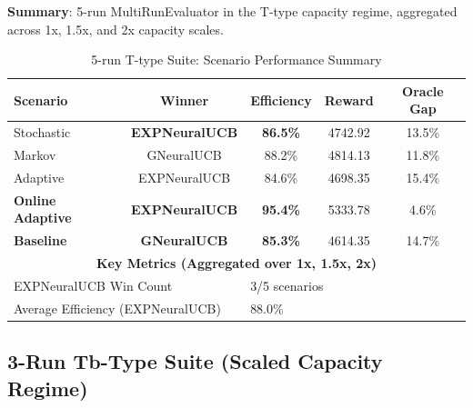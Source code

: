 \documentclass[11pt,a4paper]{article}
\newcommand{\stochastic}[1]{\textcolor{stochasticcolor}{\textbf{#1}}}
\newcommand{\success}[1]{\textcolor{successcolor}{\textbf{#1}}}
\begin{document}
\begin{tcolorbox}[colback=performancecolor!10,colframe=performancecolor]

\textbf{Summary}: 5-run MultiRunEvaluator in the T-type capacity regime, aggregated across 1x, 1.5x, and 2x capacity scales.

\begin{table}[H]
\centering
\caption{5-run T-type Suite: Scenario Performance Summary}
\begin{tabular}{|l|c|c|c|c|}
\hline
\textbf{Scenario} & \textbf{Winner} & \textbf{Efficiency} & \textbf{Reward} & \textbf{Oracle Gap} \\
\hline
\hline
Stochastic      & \stochastic{EXPNeuralUCB} & \stochastic{86.5\%} & 4742.92 & 13.5\% \\
Markov          & GNeuralUCB                & 88.2\%              & 4814.13 & 11.8\% \\
Adaptive        & EXPNeuralUCB              & 84.6\%              & 4698.35 & 15.4\% \\
\success{Online Adaptive} & \success{EXPNeuralUCB} & \success{95.4\%} & 5333.78 & 4.6\% \\
\success{Baseline}        & \success{GNeuralUCB}   & \success{85.3\%} & 4614.35 & 14.7\% \\
\hline
\multicolumn{5}{|c|}{\textbf{Key Metrics (Aggregated over 1x, 1.5x, 2x)}} \\
\hline
\multicolumn{2}{|l|}{EXPNeuralUCB Win Count} & \multicolumn{3}{|l|}{3/5 scenarios} \\
\multicolumn{2}{|l|}{Average Efficiency (EXPNeuralUCB)} & \multicolumn{3}{|l|}{88.0\%} \\
\hline
\end{tabular}
\end{table}

\end{tcolorbox}

\subsection{3-Run Tb-Type Suite (Scaled Capacity Regime)}
\end{document}
